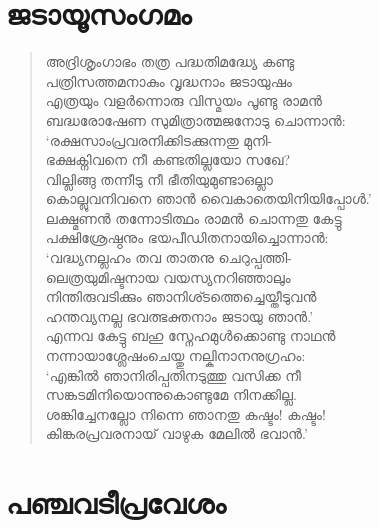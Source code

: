 \section{ജടായൂസംഗമം}

\begin{verse}
അദ്രിശൃംഗാഭം തത്ര പദ്ധതിമദ്ധ്യേ കണ്ടു\\
പത്രിസത്തമനാകും വൃദ്ധനാം ജടായുഷം\\
എത്രയും വളര്‍ന്നൊരു വിസ്മയം പൂണ്ടു രാമന്‍\\
ബദ്ധരോഷേണ സുമിത്രാത്മജനോടു ചൊന്നാന്‍:\\
‘രക്ഷസാംപ്രവരനിക്കിടക്കുന്നതു മുനി-\\
ഭക്ഷക്നിവനെ നീ കണ്ടതില്ലയോ സഖേ?\\
വില്ലിങ്ങു തന്നീടു നീ ഭീതിയുമുണ്ടാഒല്ലാ\\
കൊല്ലുവനിവനെ ഞാന്‍ വൈകാതെയിനിയിപ്പോള്‍.’\\
ലക്ഷ്മണന്‍ തന്നോടിത്ഥം രാമന്‍ ചൊന്നതു കേട്ടു\\
പക്ഷിശ്രേഷ്ഠനും ഭയപീഡിതനായിച്ചൊന്നാന്‍:\\
‘വദ്ധ്യനല്ലഹം തവ താതനു ചെറുപ്പത്തി-\\
ലെത്രയുമിഷ്ടനായ വയസ്യനറിഞ്ഞാലും\\
നിന്തിരുവടിക്കും ഞാനിശ്ടത്തെച്ചെയ്തീടുവന്‍\\
ഹന്തവ്യനല്ല ഭവത്ഭക്തനാം ജടായു ഞാന്‍.’\\
എന്നവ കേട്ടു ബഹു സ്നേഹമുള്‍ക്കൊണ്ടു നാഥന്‍\\
നന്നായാശ്ലേഷംചെയ്തു നല്കിനാനനുഗ്രഹം:\\
‘എങ്കില്‍ ഞാനിരിപ്പതിനടുത്തു വസിക്ക നീ\\
സങ്കടമിനിയൊന്നുകൊണ്ടുമേ നിനക്കില്ല.\\
ശങ്കിച്ചേനല്ലോ നിന്നെ ഞാനതു കഷ്ടം! കഷ്ടം!\\
കിങ്കരപ്രവരനായ് വാഴുക മേലില്‍ ഭവാന്‍.’
\end{verse}

\section{പഞ്ചവടീപ്രവേശം}


